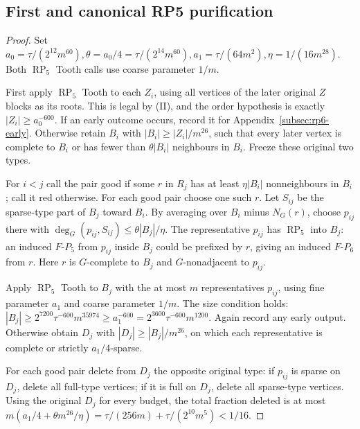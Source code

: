 \documentclass[11pt,a4paper]{article}
\theoremstyle{definition}
\theoremstyle{remark}
\numberwithin{equation}{section}
\begin{document}
\subsection{First and canonical RP5 purification}\label{subsec:rp6-first}
\begin{proof}
Set \(a_{0} = \tau/(2^{12} m^{60}),\allowbreak    \theta = a_{0}/4 = \tau/(2^{14} m^{60}),\allowbreak  a_{1} = \tau/(64m^{2}),\allowbreak       \eta = 1/(16m^{28})\). Both \(\operatorname{RP}_{5}\) Tooth calls use coarse parameter \(1/m\).

First apply \(\operatorname{RP}_{5}\) Tooth to each \(Z_{i}\), using all vertices of the later original \(Z\) blocks as its roots. This is legal by (II), and the order hypothesis is exactly \(|Z_{i}|\ge\allowbreak a_{0}^{-600}\). If an early outcome occurs, record it for Appendix~\ref{subsec:rp6-early}. Otherwise retain \(B_{i}\) with \(|B_{i}|\ge\allowbreak |Z_{i}|/m^{26}\), such that every later vertex is complete to \(B_{i}\) or has fewer than \(\theta |B_{i}|\) neighbours in \(B_{i}\). Freeze these original two types.

For \(i<j\) call the pair good if some \(r\) in \(R_{j}\) has at least \(\eta |B_{i}|\) nonneighbours in \(B_{i}\); call it red otherwise. For each good pair choose one such \(r\). Let \(S_{ij}\) be the sparse-type part of \(B_{j}\) toward \(B_{i}\). By averaging over \(B_{i}\) minus \(N_{G}(r)\), choose \(p_{ij}\) there with \(\deg _{G}(p_{ij},\allowbreak S_{ij}) \le\allowbreak  \theta |B_{j}|/\eta\). The representative \(p_{ij}\) has \(\operatorname{RP}_{5}\) into \(B_{j}\): an induced \(F\text{-}P_{5}\) from \(p_{ij}\) inside \(B_{j}\) could be prefixed by \(r\), giving an induced \(F\text{-}P_{6}\) from \(r\). Here \(r\) is \(G\)-complete to \(B_{j}\) and \(G\)-nonadjacent to \(p_{ij}\).

Apply \(\operatorname{RP}_{5}\) Tooth to \(B_{j}\) with the at most \(m\) representatives \(p_{ij}\), using fine parameter \(a_{1}\) and coarse parameter \(1/m\). The size condition holds: \(|B_{j}| \ge\allowbreak  2^{7200} \tau^{-600} m^{35974} \ge\allowbreak  a_{1}^{-600} = 2^{3600} \tau^{-600} m^{1200}\). Again record any early output. Otherwise obtain \(D_{j}\) with \(|D_{j}|\ge\allowbreak |B_{j}|/m^{26}\), on which each representative is complete or strictly \(a_{1}/4\)-sparse.

For each good pair delete from \(D_{j}\) the opposite original type: if \(p_{ij}\) is sparse on \(D_{j}\), delete all full-type vertices; if it is full on \(D_{j}\), delete all sparse-type vertices. Using the original \(D_{j}\) for every budget, the total fraction deleted is at most \(m(a_{1}/4 + \theta m^{26}/\eta) = \tau/(256m) + \tau/(2^{10} m^{5}) < 1/16\).


\end{proof}
\end{document}
